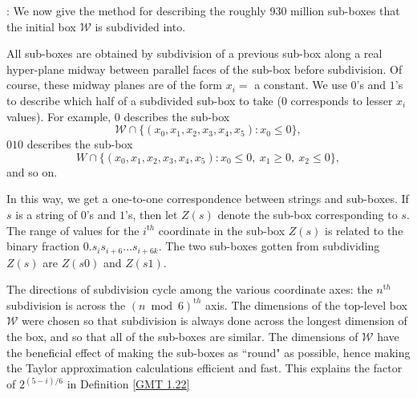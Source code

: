 \begin{construction} \label{GMT 5.3}: 
We now give the method for describing the roughly 930 million sub-boxes that the initial box ${\mathcal W}$ is subdivided into.

All sub-boxes are obtained by subdivision of a previous sub-box along a real
hyper-plane midway between parallel faces of the sub-box before
subdivision.  Of course, these midway planes are of the form $x_i = $ a
constant.   We use $0$'s and $1$'s to describe which half of a subdivided
sub-box to take ($0$ corresponds to lesser $x_i$ values).  For example, 0
describes 
the sub-box $${\mathcal W} \cap \{(x_0,x_1,x_2,x_3,x_4,x_5): x_0 \le 0 \},$$ 
$010$ describes the sub-box 
$$W \cap \{(x_0,x_1,x_2,x_3, x_4,x_5) : x_0 \le 0,\ x_1 \ge 0,\ x_2 \le 0 \},$$
and so on.

In this way, we get a one-to-one correspondence
between strings and sub-boxes.
If $s$ is a string of $0$'s and $1$'s, then let $Z(s)$ denote
the sub-box corresponding to $s$.
The range of values for the $i^{\mathrm th}$ coordinate in the sub-box $Z(s)$ is related
to the binary fraction $0.s_{i}s_{i+6}\ldots s_{i+6k}$.
The two sub-boxes gotten from
subdividing $Z(s)$ are $Z(s0)$ and $Z(s1)$.

The directions of subdivision cycle among the various coordinate axes:
the $n^{\mathrm th}$ subdivision is across the $(n \bmod 6)^{\mathrm th}$ axis.
The dimensions of the top-level box ${\mathcal W}$ were chosen so that subdivision
is always done across the longest dimension of the box,
and so that all of the sub-boxes are similar.  
The dimensions of ${\mathcal W}$ have the beneficial effect of making the sub-boxes as ``round" as possible, hence making the Taylor approximation calculations efficient and fast.
This explains the factor of $2^{(5-i)/6}$ in Definition 
\ref{GMT 1.22}


\end{construction}
